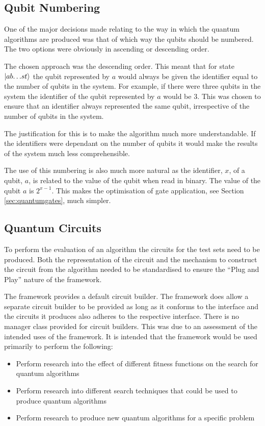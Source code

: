 \subsection{Qubit Numbering}
\label{sec:qubitnum}
One of the major decisions made relating to the way in which the quantum algorithms are produced was that of which way the qubits should be numbered.
The two options were obviously in ascending or descending order.

The chosen approach was the descending order.
This meant that for state $\left\vert{ab{\dots}st}\right\rangle$ the qubit represented by $a$ would always be given the identifier equal to the number of qubits in the system.
For example, if there were three qubits in the system the identifier of the qubit represented by $a$ would be $3$.
This was chosen to ensure that an identifier always represented the same qubit, irrespective of the number of qubits in the system.

The justification for this is to make the algorithm much more understandable.
If the identifiers were dependant on the number of qubits it would make the results of the system much less comprehensible.

The use of this numbering is also much more natural as the identifier, $x$, of a qubit, $a$, is related to the value of the qubit when read in binary.
The value of the qubit $a$ is $2^{x-1}$.
This makes the optimisation of gate application, see Section \ref{sec:quantumgates}, much simpler.

\subsection{Quantum Circuits}
\label{sec:quantumcircuits}
To perform the evaluation of an algorithm the circuits for the test sets need to be produced.
Both the representation of the circuit and the mechanism to construct the circuit from the algorithm needed to be standardised to ensure the ``Plug and Play'' nature of the framework.

The framework provides a default circuit builder.
The framework does allow a separate circuit builder to be provided as long as it conforms to the interface and the circuits it produces also adheres to the respective interface.
There is no manager class provided for circuit builders.
This was due to an assessment of the intended uses of the framework.
It is intended that the framework would be used primarily to perform the following:
\begin{itemize}
  \item Perform research into the effect of different fitness functions on the search for quantum algorithms
  \item Perform research into different search techniques that could be used to produce quantum algorithms
  \item Perform research to produce new quantum algorithms for a specific problem
\end{itemize}


